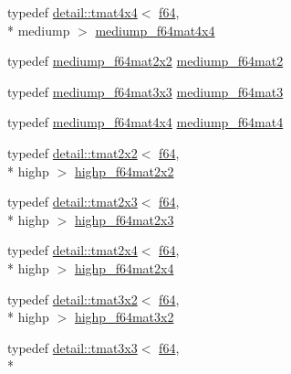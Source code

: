 \begin{DoxyCompactItemize}
\item 
typedef \hyperlink{structglm_1_1detail_1_1tmat4x4}{detail\-::tmat4x4}$<$ \hyperlink{group__gtc__type__precision_ga2bba392e555124b36cde6abba349bab3}{f64}, \\*
mediump $>$ \hyperlink{group__gtc__type__precision_ga941e42a0b337b5c8ad9c324aaa6b2ad5}{mediump\-\_\-f64mat4x4}
\item 
typedef \hyperlink{group__gtc__type__precision_gacfa9f872c78d9e8b8e6c5dd0088db8fc}{mediump\-\_\-f64mat2x2} \hyperlink{group__gtc__type__precision_gaa7eac0340d2aaf670ec4dfbd1826fd35}{mediump\-\_\-f64mat2}
\item 
typedef \hyperlink{group__gtc__type__precision_ga871b69a221dae7461aa746e6e6d372fc}{mediump\-\_\-f64mat3x3} \hyperlink{group__gtc__type__precision_gae38a4a0b57e25d9cbb153dcaab9432ec}{mediump\-\_\-f64mat3}
\item 
typedef \hyperlink{group__gtc__type__precision_ga941e42a0b337b5c8ad9c324aaa6b2ad5}{mediump\-\_\-f64mat4x4} \hyperlink{group__gtc__type__precision_ga2763f655bfe2141a014e66d26a9d2f18}{mediump\-\_\-f64mat4}
\item 
typedef \hyperlink{structglm_1_1detail_1_1tmat2x2}{detail\-::tmat2x2}$<$ \hyperlink{group__gtc__type__precision_ga2bba392e555124b36cde6abba349bab3}{f64}, \\*
highp $>$ \hyperlink{group__gtc__type__precision_ga4babca568fc88f185620c02e4fdac0d8}{highp\-\_\-f64mat2x2}
\item 
typedef \hyperlink{structglm_1_1detail_1_1tmat2x3}{detail\-::tmat2x3}$<$ \hyperlink{group__gtc__type__precision_ga2bba392e555124b36cde6abba349bab3}{f64}, \\*
highp $>$ \hyperlink{group__gtc__type__precision_gafb5b42b29b3bd7f1605483223fa35312}{highp\-\_\-f64mat2x3}
\item 
typedef \hyperlink{structglm_1_1detail_1_1tmat2x4}{detail\-::tmat2x4}$<$ \hyperlink{group__gtc__type__precision_ga2bba392e555124b36cde6abba349bab3}{f64}, \\*
highp $>$ \hyperlink{group__gtc__type__precision_ga72fae79e6633cbc6bf691f69278b36d3}{highp\-\_\-f64mat2x4}
\item 
typedef \hyperlink{structglm_1_1detail_1_1tmat3x2}{detail\-::tmat3x2}$<$ \hyperlink{group__gtc__type__precision_ga2bba392e555124b36cde6abba349bab3}{f64}, \\*
highp $>$ \hyperlink{group__gtc__type__precision_ga5cdc9d6fb9ce07e5485c4e2db919ce7e}{highp\-\_\-f64mat3x2}
\item 
typedef \hyperlink{structglm_1_1detail_1_1tmat3x3}{detail\-::tmat3x3}$<$ \hyperlink{group__gtc__type__precision_ga2bba392e555124b36cde6abba349bab3}{f64}, \\*

\end{DoxyCompactItemize}
